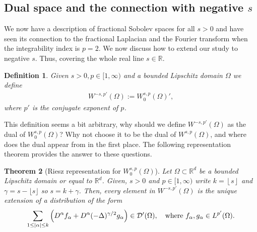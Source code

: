 \documentclass[
    a4paper,
    DIV=14,
    abstract=true,
    numbers=noenddot
]
{scrartcl}
\newtheorem{theorem}{Theorem}[section]
\newtheorem{definition}[theorem]{Definition}
\theoremstyle{definition}
\newcommand{\R}{\mathbb{R}}
\newcommand{\Dd}{\mathcal{D}}
\begin{document}
\subsection{Dual space and the connection with negative $s$}

We now have a description of fractional Sobolev spaces for all $s>0$ and have seen its connection to the fractional Laplacian and the Fourier transform when the integrability index is $p=2$. We now discuss how to extend our study to negative $s$. Thus, covering the whole real line $s \in \R$.

\begin{definition}\label{dual definition}
	Given $s>0, p \in [1,\infty)$ and a bounded Lipschitz domain $\Omega $ we define
	\begin{align*}
		W^{-s,p'}(\Omega ):= W^{s,p}_0(\Omega )',
	\end{align*}
	where $p'$ is the conjugate exponent of $p$.
\end{definition}
This definition seems a bit arbitrary, why should we define $W^{-s,p'}(\Omega )$ as the dual of $W^{s,p}_0(\Omega )$? Why not choose it to be the dual of $W^{s,p}(\Omega )$, and where does the dual appear from in the first place. The following representation theorem provides the answer to these questions.
\begin{theorem}[Riesz representation for $W_0^{s,p}(\Omega )$]\label{riesz representation}
	Let $\Omega \subset \R^d$ be a bounded Lipschitz domain or equal to $\R^d$. Given,  $s>0$ and $p \in [1,\infty)$ write $k=\left\lfloor  s\right\rfloor$ and $\gamma = s- \lfloor s\rfloor$ so $s= k+\gamma $. Then,  every element in $W^{-s,p'}(\Omega )$ is the unique extension of a distribution  of the form
	\begin{align*}
		\sum_{1\leq\abs{\alpha}\leq k}\left( D^\alpha f_\alpha+  D^\alpha (-\Delta )^{\gamma /2} g_\alpha\right)\in \Dd'(\Omega ),\quad \text{where }    f_\alpha, g_\alpha \in L^{p'}(\Omega ).
	\end{align*}

\end{theorem}
\end{document}
